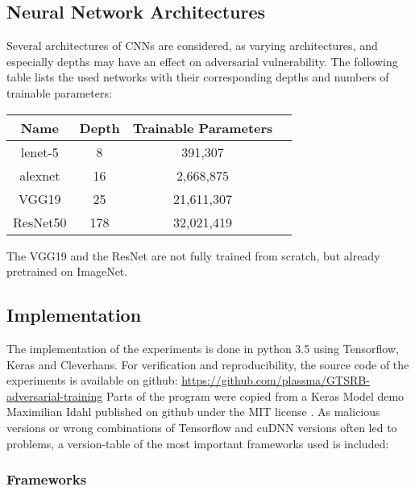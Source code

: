\documentclass[draft,final]{vutinfth} %
\begin{document}

\subsection{Neural Network Architectures}

Several architectures of CNNs are considered, as varying architectures, and especially depths may have an effect on adversarial vulnerability.
The following table lists the used networks with their corresponding depths and numbers of trainable parameters:

\begin{table}[h]
  \centering
  \begin{tabular}{cccc}
    \toprule
		Name    		& Depth		& Trainable Parameters\\
    \midrule
		lenet-5			&	8				& 391,307							\\
		alexnet 		& 16			& 2,668,875						\\
		VGG19				& 25			& 21,611,307					\\
		ResNet50		& 178			& 32,021,419					\\
    
    \bottomrule
  \end{tabular}
\end{table}


The VGG19 and the ResNet are not fully trained from scratch, but already pretrained on ImageNet.
\subsection{Implementation}

The implementation of the experiments is done in python 3.5 using Tensorflow, Keras and Cleverhans.
For verification and reproducibility, the source code of the experiments is available on github: \url{https://github.com/plassma/GTSRB-adversarial-training}
Parts of the program were copied from a Keras Model demo Maximilian Idahl published on github under the MIT license \cite{Idahl2018}.
As malicious versions or wrong combinations of Tensorflow and cuDNN versions often led to problems, a version-table of the most important frameworks used is included:

\subsubsection{Frameworks}
\end{document}
